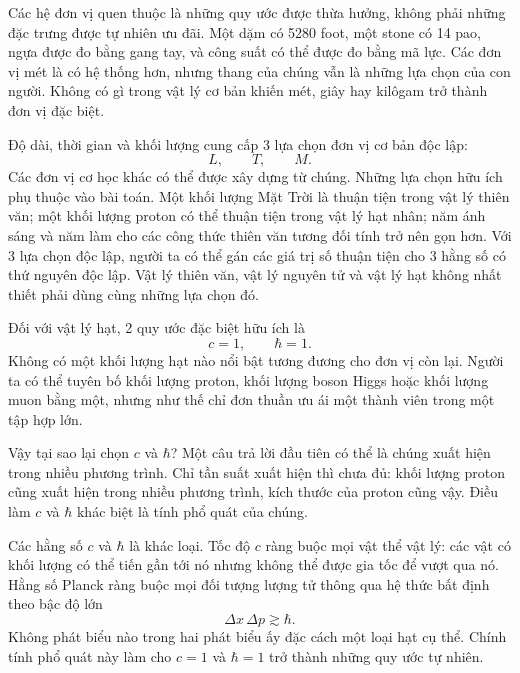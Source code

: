 Các hệ đơn vị quen thuộc là những quy ước được thừa hưởng, không phải những đặc trưng được tự nhiên ưu đãi. Một dặm có 5280 foot, một stone có 14 pao, ngựa được đo bằng gang tay, và công suất có thể được đo bằng mã lực. Các đơn vị mét là có hệ thống hơn, nhưng thang của chúng vẫn là những lựa chọn của con người. Không có gì trong vật lý cơ bản khiến mét, giây hay kilôgam trở thành đơn vị đặc biệt.

Độ dài, thời gian và khối lượng cung cấp 3 lựa chọn đơn vị cơ bản độc lập:
\begin{equation}
L,\qquad T,\qquad M.
\end{equation}
Các đơn vị cơ học khác có thể được xây dựng từ chúng. Những lựa chọn hữu ích phụ thuộc vào bài toán. Một khối lượng Mặt Trời là thuận tiện trong vật lý thiên văn; một khối lượng proton có thể thuận tiện trong vật lý hạt nhân; năm ánh sáng và năm làm cho các công thức thiên văn tương đối tính trở nên gọn hơn. Với 3 lựa chọn độc lập, người ta có thể gán các giá trị số thuận tiện cho 3 hằng số có thứ nguyên độc lập. Vật lý thiên văn, vật lý nguyên tử và vật lý hạt không nhất thiết phải dùng cùng những lựa chọn đó.

Đối với vật lý hạt, 2 quy ước đặc biệt hữu ích là
\begin{equation}
c=1,
\qquad
\hbar=1.
\end{equation}
Không có một khối lượng hạt nào nổi bật tương đương cho đơn vị còn lại. Người ta có thể tuyên bố khối lượng proton, khối lượng boson Higgs hoặc khối lượng muon bằng một, nhưng như thế chỉ đơn thuần ưu ái một thành viên trong một tập hợp lớn.

Vậy tại sao lại chọn \(c\) và \(\hbar\)? Một câu trả lời đầu tiên có thể là chúng xuất hiện trong nhiều phương trình. Chỉ tần suất xuất hiện thì chưa đủ: khối lượng proton cũng xuất hiện trong nhiều phương trình, kích thước của proton cũng vậy. Điều làm \(c\) và \(\hbar\) khác biệt là tính phổ quát của chúng.

Các hằng số \(c\) và \(\hbar\) là khác loại. Tốc độ \(c\) ràng buộc mọi vật thể vật lý: các vật có khối lượng có thể tiến gần tới nó nhưng không thể được gia tốc để vượt qua nó. Hằng số Planck ràng buộc mọi đối tượng lượng tử thông qua hệ thức bất định theo bậc độ lớn
\begin{equation}
\Delta x\,\Delta p\gtrsim\hbar.
\end{equation}
Không phát biểu nào trong hai phát biểu ấy đặc cách một loại hạt cụ thể. Chính tính phổ quát này làm cho \(c=1\) và \(\hbar=1\) trở thành những quy ước tự nhiên.

